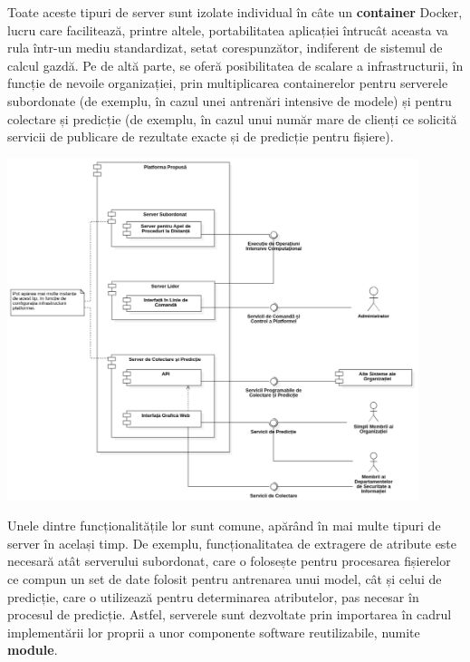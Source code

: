 \documentclass[../../main.tex]{subfiles}
\begin{document}
Toate aceste tipuri de server sunt izolate individual în câte un \textbf{container} Docker, lucru care facilitează, printre altele, portabilitatea aplicației întrucât aceasta va rula într-un mediu standardizat, setat corespunzător, indiferent de sistemul de calcul gazdă. Pe de altă parte, se oferă posibilitatea de scalare a infrastructurii, în funcție de nevoile organizației, prin multiplicarea containerelor pentru serverele subordonate (de exemplu, în cazul unei antrenări intensive de modele) și pentru colectare și predicție (de exemplu, în cazul unui număr mare de clienți ce solicită servicii de publicare de rezultate exacte și de predicție pentru fișiere).

\vspace{0.3cm}
\begin{center}
    \includegraphics[width=12cm]{components/images/diagrams/component_diagram_servers.png}
    \label{fig:component_diagram_servers}
    \captionsetup{justification=centering,margin=1cm}
\end{center}
\vspace{0.3cm}

\newpage

Unele dintre funcționalitățile lor sunt comune, apărând în mai multe tipuri de server în același timp. De exemplu, funcționalitatea de extragere de atribute este necesară atât serverului subordonat, care o folosește pentru procesarea fișierelor ce compun un set de date folosit pentru antrenarea unui model, cât și celui de predicție, care o utilizează pentru determinarea atributelor, pas necesar în procesul de predicție. Astfel, serverele sunt dezvoltate prin importarea în cadrul implementării lor proprii a unor componente software reutilizabile, numite \textbf{module}.
\end{document}

